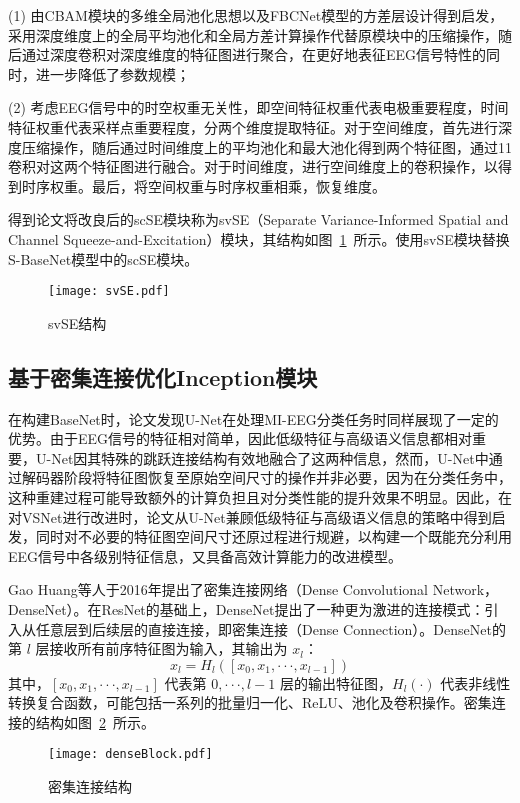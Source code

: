 (1) 由CBAM模块的多维全局池化思想以及FBCNet模型的方差层设计\cite{mane2021fbcnet}得到启发，采用深度维度上的全局平均池化和全局方差计算操作代替原模块中的压缩操作，随后通过深度卷积对深度维度的特征图进行聚合，在更好地表征EEG信号特性的同时，进一步降低了参数规模；

(2) 考虑EEG信号中的时空权重无关性，即空间特征权重代表电极重要程度，时间特征权重代表采样点重要程度，分两个维度提取特征。对于空间维度，首先进行深度压缩操作，随后通过时间维度上的平均池化和最大池化得到两个特征图，通过1\times1卷积对这两个特征图进行融合。对于时间维度，进行空间维度上的卷积操作，以得到时序权重。最后，将空间权重与时序权重相乘，恢复维度。

得到论文将改良后的scSE模块称为svSE（Separate Variance-Informed Spatial and Channel Squeeze-and-Excitation）模块，其结构如图~\ref{fig:svSE}~所示。使用svSE模块替换S-BaseNet模型中的scSE模块。
\begin{figure}
  \centering
  \texttt{[image: svSE.pdf]}
  \caption{svSE结构}
  \label{fig:svSE}
\end{figure}

\subsection{基于密集连接优化Inception模块}

在构建BaseNet时，论文发现U-Net在处理MI-EEG分类任务时同样展现了一定的优势。由于EEG信号的特征相对简单，因此低级特征与高级语义信息都相对重要，U-Net因其特殊的跳跃连接结构有效地融合了这两种信息，然而，U-Net中通过解码器阶段将特征图恢复至原始空间尺寸的操作并非必要，因为在分类任务中，这种重建过程可能导致额外的计算负担且对分类性能的提升效果不明显。因此，在对VSNet进行改进时，论文从U-Net兼顾低级特征与高级语义信息的策略中得到启发，同时对不必要的特征图空间尺寸还原过程进行规避，以构建一个既能充分利用EEG信号中各级别特征信息，又具备高效计算能力的改进模型。

Gao Huang等人于2016年提出了密集连接网络\cite{huang2017densely}（Dense Convolutional Network，DenseNet）。在ResNet的基础上，DenseNet提出了一种更为激进的连接模式：引入从任意层到后续层的直接连接，即密集连接（Dense Connection）。DenseNet的第 \(l\) 层接收所有前序特征图为输入，其输出为 \(x_l\)：
\begin{equation}
  x_l = H_l([x_0, x_1, ···, x_{l-1}])
  \label{eq:dense-conn}
\end{equation}
其中，\([x_0, x_1, ···, x_{l-1}]\) 代表第 \(0, ···, l-1\) 层的输出特征图，\(H_l(·)\) 代表非线性转换复合函数，可能包括一系列的批量归一化、ReLU、池化及卷积操作。密集连接的结构如图~\ref{fig:denseBlock}~所示。
\begin{figure}
  \centering
  \texttt{[image: denseBlock.pdf]}
  \caption{密集连接结构}
  \label{fig:denseBlock}
\end{figure}

